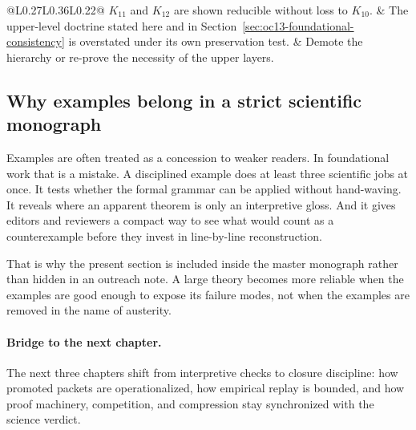 \begin{table}[htbp]
\begin{tabular}{@{}L{0.27\textwidth}L{0.36\textwidth}L{0.22\textwidth}@{}}
\(K_{11}\) and \(K_{12}\) are shown reducible without loss to \(K_{10}\). & The upper-level doctrine stated here and in Section~\ref{sec:oc13-foundational-consistency} is overstated under its own preservation test. & Demote the hierarchy or re-prove the necessity of the upper layers. \\
\bottomrule
\end{tabular}
\endgroup
\caption{Examples of observations or formal objections that would genuinely change the scientific
status of the present release. The table is meant to preserve falsifiability, not to immunize the
framework against criticism.}
\label{tab:oc13-counterexamples}
\end{table}

\subsection{Why examples belong in a strict scientific monograph}

Examples are often treated as a concession to weaker readers. In foundational work that is a
mistake. A disciplined example does at least three scientific jobs at once. It tests whether the
formal grammar can be applied without hand-waving. It reveals where an apparent theorem is only an
interpretive gloss. And it gives editors and reviewers a compact way to see what would count as a
counterexample before they invest in line-by-line reconstruction.

That is why the present section is included inside the master monograph rather than hidden in an
outreach note. A large theory becomes more reliable when the examples are good enough to expose
its failure modes, not when the examples are removed in the name of austerity.

\paragraph{Bridge to the next chapter.}
The next three chapters shift from interpretive checks to closure discipline:
how promoted packets are operationalized, how empirical replay is bounded, and
how proof machinery, competition, and compression stay synchronized with the
science verdict.

\clearpage
